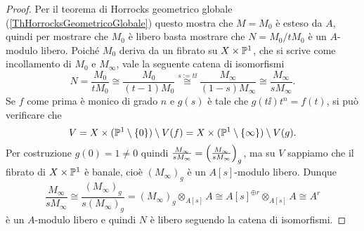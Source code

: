 \begin{proof}
Per il teorema di Horrocks geometrico globale (\ref{ThHorrocksGeometricoGlobale}) questo mostra che $M=M_0$ \`e esteso da $A$, quindi per mostrare che $M_0$ \`e libero basta mostrare che $N=M_0/tM_0$ \`e un $A$-modulo libero. Poich\'e $M_0$ deriva da un fibrato su $X\times \mathbb{P}^1$, che si scrive come incollamento di $M_0$ e $M_\infty$, vale la seguente catena di isomorfismi
\[N=\frac{M_0}{tM_0}\cong \frac{M_0}{(t-1)M_0}\overset{s:=t\ii}\cong \frac{M_\infty}{(1-s)M_\infty}\cong \frac{M_\infty}{s M_\infty}.\]
Se $f$ come prima \`e monico di grado $n$ e $g(s)$ \`e tale che $g(t\ii)t^n=f(t)$, si pu\`o verificare che
\[V=X\times(\mathbb{P}^1\setminus\{0\})\setminus V(f)=X\times(\mathbb{P}^1\setminus\left\{{\infty}\right\})\setminus V(g).\]
Per costruzione $g(0)=1\neq0$ quindi $\frac{M_\infty}{s M_\infty}=\left({\frac{M_\infty}{s M_\infty}}\right)_g$, ma su $V$ sappiamo che il fibrato di $X\times \mathbb{P}^1$ \`e banale, cio\`e $(M_\infty)_g$ \`e un $A[s]$-modulo libero. Dunque
\[\frac{M_\infty}{s M_\infty}\cong \frac{(M_\infty)_g}{s (M_\infty)_g}=(M_{\infty})_g\otimes_{A[s]}A\cong A[s]^{\oplus r}\otimes_{A[s]}A\cong A^{r}\]
\`e un $A$-modulo libero e quindi $N$ \`e libero seguendo la catena di isomorfismi.
\end{proof}


